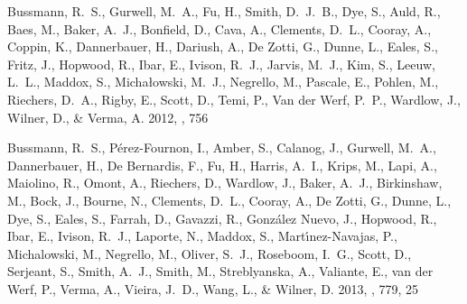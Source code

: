 \documentclass[iop]{emulateapj}
\begin{document}
\begin{thebibliography}{107}
{Bussmann}, R.~S., {Gurwell}, M.~A., {Fu}, H., {Smith}, D.~J.~B., {Dye}, S.,
  {Auld}, R., {Baes}, M., {Baker}, A.~J., {Bonfield}, D., {Cava}, A.,
  {Clements}, D.~L., {Cooray}, A., {Coppin}, K., {Dannerbauer}, H., {Dariush},
  A., {De Zotti}, G., {Dunne}, L., {Eales}, S., {Fritz}, J., {Hopwood}, R.,
  {Ibar}, E., {Ivison}, R.~J., {Jarvis}, M.~J., {Kim}, S., {Leeuw}, L.~L.,
  {Maddox}, S., {Micha{\l}owski}, M.~J., {Negrello}, M., {Pascale}, E.,
  {Pohlen}, M., {Riechers}, D.~A., {Rigby}, E., {Scott}, D., {Temi}, P., {Van
  der Werf}, P.~P., {Wardlow}, J., {Wilner}, D., \& {Verma}, A. 2012, \apj, 756

{Bussmann}, R.~S., {P{\'e}rez-Fournon}, I., {Amber}, S., {Calanog}, J.,
  {Gurwell}, M.~A., {Dannerbauer}, H., {De Bernardis}, F., {Fu}, H., {Harris},
  A.~I., {Krips}, M., {Lapi}, A., {Maiolino}, R., {Omont}, A., {Riechers}, D.,
  {Wardlow}, J., {Baker}, A.~J., {Birkinshaw}, M., {Bock}, J., {Bourne}, N.,
  {Clements}, D.~L., {Cooray}, A., {De Zotti}, G., {Dunne}, L., {Dye}, S.,
  {Eales}, S., {Farrah}, D., {Gavazzi}, R., {Gonz{\'a}lez Nuevo}, J.,
  {Hopwood}, R., {Ibar}, E., {Ivison}, R.~J., {Laporte}, N., {Maddox}, S.,
  {Mart{\'{\i}}nez-Navajas}, P., {Michalowski}, M., {Negrello}, M., {Oliver},
  S.~J., {Roseboom}, I.~G., {Scott}, D., {Serjeant}, S., {Smith}, A.~J.,
  {Smith}, M., {Streblyanska}, A., {Valiante}, E., {van der Werf}, P., {Verma},
  A., {Vieira}, J.~D., {Wang}, L., \& {Wilner}, D. 2013, \apj, 779, 25


\end{thebibliography}
\end{document}
